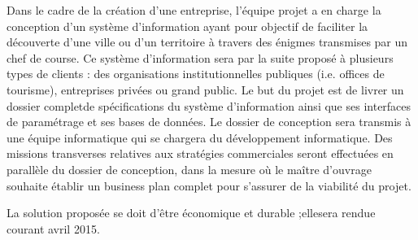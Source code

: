 Dans le cadre de la création d’une entreprise,  l’équipe projet a en charge la conception d’un système d’information ayant pour objectif de faciliter la découverte d’une ville ou d’un territoire à travers des énigmes transmises par un chef de course.
Ce système d’information sera par la suite proposé à plusieurs types de clients : des organisations institutionnelles publiques (i.e. offices de tourisme), entreprises privées ou grand public.
Le but du projet est de livrer un dossier completde spécifications du système d’information ainsi que ses interfaces de paramétrage et ses bases de données. Le dossier de conception sera transmis à une équipe informatique qui se chargera du développement informatique. 
Des missions transverses relatives aux stratégies commerciales seront effectuées en parallèle du dossier de conception, dans la mesure où le maître d’ouvrage souhaite établir un business plan complet pour s’assurer de la viabilité du projet.

La solution proposée se doit d’être économique et durable ;ellesera rendue courant avril 2015.
